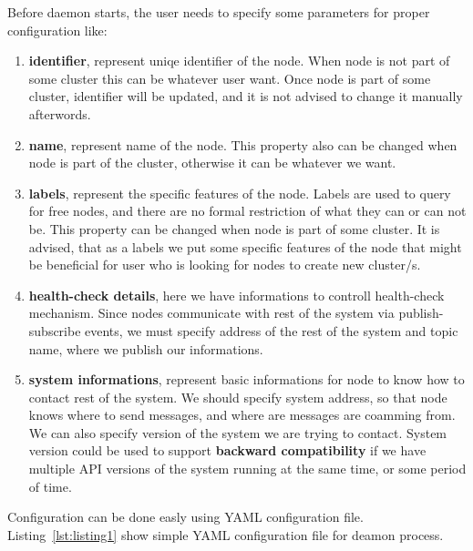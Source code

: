 

Before daemon starts, the user needs to specify some parameters for proper configuration like: 

\begin{enumerate}[start=1,label={(\bfseries \arabic*)}] \label{imp:features}
	\item \textbf{identifier}, represent uniqe identifier of the node. When node is not part of some cluster this can be whatever user want. Once node is part of some cluster, identifier will be updated, and it is not advised to change it manually afterwords.
	\item \textbf{name}, represent name of the node. This property also can be changed when node is part of the cluster, otherwise it can be whatever we want.
	\item \textbf{labels}, represent the specific features of the node. Labels are used to query for free nodes, and there are no formal restriction of what they can or can not be. This property can be changed when node is part of some cluster. It is advised, that as a labels we put some specific features of the node that might be beneficial for user who is looking for nodes to create new cluster/s.
	\item \textbf{health-check details}, here we have informations to controll health-check mechanism. Since nodes communicate with rest of the system via publish-subscribe events, we must specify address of the rest of the system and topic name, where we publish our informations.
	\item \textbf{system informations}, represent basic informations for node to know how to contact rest of the system. We should specify system address, so that node knows where to send messages, and where are messages are coamming from. We can also specify version of the system we are trying to contact. System version could be used to support \textbf{backward compatibility} if we have multiple API versions of the system running at the same time, or some period of time.
\end{enumerate} 

Configuration can be done easly using YAML configuration file. Listing~\ref{lst:listing1} show simple YAML configuration file for deamon process.



